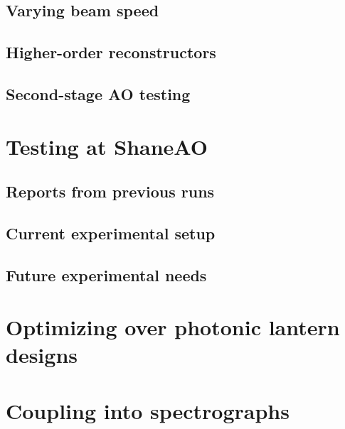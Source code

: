 \documentclass[12pt]{article}
\begin{document}
\subsection{Varying beam speed}

\subsection{Higher-order reconstructors}

\subsection{Second-stage AO testing}

\section{Testing at ShaneAO}

\subsection{Reports from previous runs}

\subsection{Current experimental setup}

\subsection{Future experimental needs}

\section{Optimizing over photonic lantern designs}



\section{Coupling into spectrographs}

\printbibliography
\end{document}

